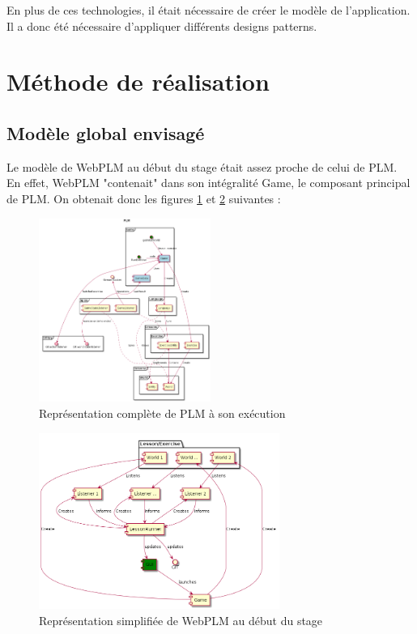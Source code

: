 \documentclass[stage]{tnreport}
\begin{document}
En plus de ces technologies, il était nécessaire de créer le modèle de l'application. Il a donc été nécessaire d'appliquer différents designs patterns.

\section{Méthode de réalisation}

\subsection{Modèle global envisagé}

Le modèle de WebPLM au début du stage était assez proche de celui de PLM. En effet, WebPLM "contenait" dans son intégralité Game, le composant principal de PLM. On obtenait donc les figures \ref{fig:plmUP1} et \ref{fig:wplmUP1} suivantes :
\begin{figure}[h]
	\centering
		\includegraphics[width=0.5\textwidth]{figures/PLM-uml-cp1}
	\caption{Représentation complète de PLM à son exécution}
	\label{fig:plmUP1}
\end{figure}
\begin{figure}[h]
	\centering
		\includegraphics[width=0.7\textwidth]{figures/WebPLM-uml-cp1}
	\caption{Représentation simplifiée de WebPLM au début du stage}
	\label{fig:wplmUP1}
\end{figure}
\end{document}
